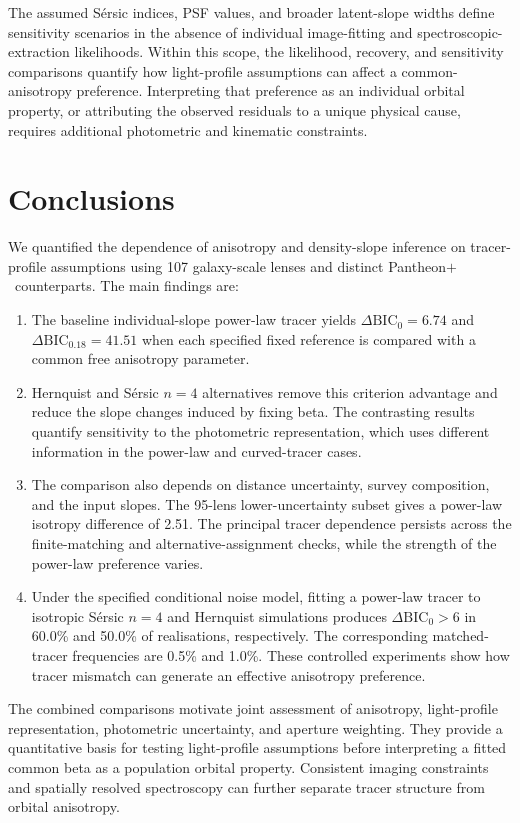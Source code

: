 \documentclass{aa}
\newcommand{\pantheon}{Pantheon$+$}
\begin{document}
The assumed S\'ersic indices, PSF values, and broader latent-slope widths define sensitivity scenarios in the absence of individual image-fitting and spectroscopic-extraction likelihoods. Within this scope, the likelihood, recovery, and sensitivity comparisons quantify how light-profile assumptions can affect a common-anisotropy preference. Interpreting that preference as an individual orbital property, or attributing the observed residuals to a unique physical cause, requires additional photometric and kinematic constraints.

\section{Conclusions}\label{sec:conclusions}
We quantified the dependence of anisotropy and density-slope inference on tracer-profile assumptions using 107 galaxy-scale lenses and distinct \pantheon\ counterparts. The main findings are:
\begin{enumerate}
\item The baseline individual-slope power-law tracer yields $\Delta\mathrm{BIC}_0=6.74$ and $\Delta\mathrm{BIC}_{0.18}=41.51$ when each specified fixed reference is compared with a common free anisotropy parameter.
\item Hernquist and S\'ersic $n=4$ alternatives remove this criterion advantage and reduce the slope changes induced by fixing beta. The contrasting results quantify sensitivity to the photometric representation, which uses different information in the power-law and curved-tracer cases.
\item The comparison also depends on distance uncertainty, survey composition, and the input slopes. The 95-lens lower-uncertainty subset gives a power-law isotropy difference of 2.51. The principal tracer dependence persists across the finite-matching and alternative-assignment checks, while the strength of the power-law preference varies.
\item Under the specified conditional noise model, fitting a power-law tracer to isotropic S\'ersic $n=4$ and Hernquist simulations produces $\Delta\mathrm{BIC}_0>6$ in 60.0\% and 50.0\% of realisations, respectively. The corresponding matched-tracer frequencies are 0.5\% and 1.0\%. These controlled experiments show how tracer mismatch can generate an effective anisotropy preference.
\end{enumerate}
The combined comparisons motivate joint assessment of anisotropy, light-profile representation, photometric uncertainty, and aperture weighting. They provide a quantitative basis for testing light-profile assumptions before interpreting a fitted common beta as a population orbital property. Consistent imaging constraints and spatially resolved spectroscopy can further separate tracer structure from orbital anisotropy.
\end{document}
